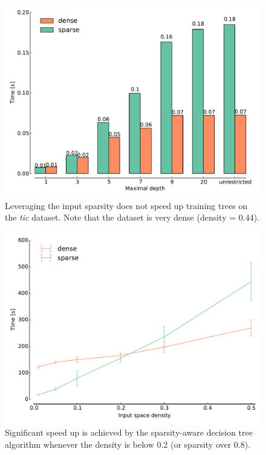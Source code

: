 \begin{figure}[h]
\centering
\includegraphics[scale=0.45]{images/tic.pdf}
\caption{Leveraging the input sparsity does not speed up training trees on the \emph{tic}
         dataset. Note that the dataset is very dense (density = 0.44).}
\label{fig:tic}
\end{figure}





\begin{figure}[h]
\centering
\includegraphics[scale=0.45]{images/density.pdf}
\caption{Significant speed up is achieved by the sparsity-aware decision tree
         algorithm whenever the density is below 0.2 (or sparsity over 0.8).}
\label{fig:density}
\end{figure}